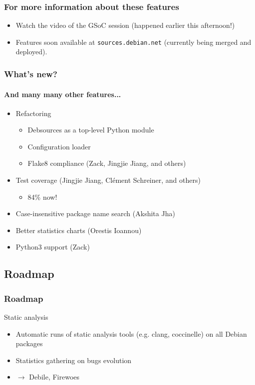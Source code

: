 \documentclass{beamer}
\begin{document}
\begin{frame}
  \frametitle{For more information about these features}

  \begin{itemize}
  \item Watch the video of the GSoC session (happened earlier this
    afternoon!)
  \item Features soon available at \texttt{sources.debian.net}
    (currently being merged and deployed).
  \end{itemize}
\end{frame}
  
\begin{frame}
  \frametitle{What's new?}
  \framesubtitle{And many many other features...}
  \begin{itemize}
  \item Refactoring
    \pause
    \begin{itemize}
    \item Debsources as a top-level Python module
      \pause
    \item Configuration loader
      \pause
    \item Flake8 compliance (Zack, Jingjie Jiang, and others)
      \pause
    \end{itemize}
  \item Test coverage (Jingjie Jiang, Clément Schreiner, and others)
    \pause
    \begin{itemize}
    \item 84\% now!
    \end{itemize}
    \pause
  \item Case-insensitive package name search (Akshita Jha)
    \pause
  \item Better statistics charts (Orestis Ioannou)
    \pause
  \item Python3 support (Zack)
  \end{itemize}
\end{frame}

\subsection{Roadmap}

\begin{frame}
  \frametitle{Roadmap}
  \begin{block}{Static analysis}
    \begin{itemize}
      \item Automatic runs of static analysis tools (e.g. clang,
        coccinelle) on all Debian packages
      \item Statistics gathering on bugs evolution
      \item $\to$ Debile, Firewoes
    \end{itemize}
  \end{block}
\end{frame}
\end{document}
